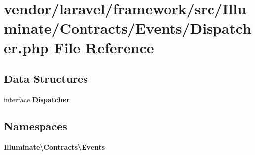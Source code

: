 \section{vendor/laravel/framework/src/\+Illuminate/\+Contracts/\+Events/\+Dispatcher.php File Reference}
\label{_contracts_2_events_2_dispatcher_8php}
\subsection*{Data Structures}
\begin{DoxyCompactItemize}
\item 
interface {\bf Dispatcher}
\end{DoxyCompactItemize}
\subsection*{Namespaces}
\begin{DoxyCompactItemize}
\item 
 {\bf Illuminate\textbackslash{}\+Contracts\textbackslash{}\+Events}
\end{DoxyCompactItemize}
